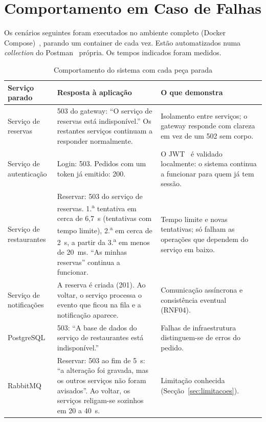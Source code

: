 \section{Comportamento em Caso de Falhas}

Os cenários seguintes foram executados no ambiente completo (Docker Compose)~\cite{compose}, parando um
container de cada vez. Estão automatizados numa \textit{collection} do Postman~\cite{postman} própria. Os tempos indicados foram medidos.

\begin{table}[H]
\centering
\small
\begin{tabularx}{\textwidth}{lXX}
\toprule
\textbf{Serviço parado} & \textbf{Resposta à aplicação} & \textbf{O que demonstra} \\
\midrule
Serviço de reservas &
503 do gateway: ``O serviço de reservas está indisponível.'' Os restantes serviços continuam
a responder normalmente. &
Isolamento entre serviços; o gateway responde com clareza em vez de um 502 sem corpo. \\
\midrule
Serviço de autenticação &
Login: 503. Pedidos com um token já emitido: 200. &
O JWT~\cite{rfc7519} é validado localmente: o sistema continua a funcionar para quem já tem sessão. \\
\midrule
Serviço de restaurantes &
Reservar: 503 do serviço de reservas. 1.\textsuperscript{a} tentativa em cerca de 6,7~s
(tentativas com tempo limite), 2.\textsuperscript{a} em cerca de 2~s, a partir da
3.\textsuperscript{a} em menos de 20~ms. ``As minhas reservas'' continua a
funcionar. &
Tempo limite e novas tentativas; só falham as operações que dependem do serviço em
baixo. \\
\midrule
Serviço de notificações &
A reserva é criada (201). Ao voltar, o serviço processa o evento que ficou na fila e a
notificação aparece. &
Comunicação assíncrona e consistência eventual (RNF04). \\
\midrule
PostgreSQL &
503: ``A base de dados do serviço de restaurantes está indisponível.'' &
Falhas de infraestrutura distinguem-se de erros do pedido. \\
\midrule
RabbitMQ &
Reservar: 503 ao fim de 5~s: ``a alteração foi gravada, mas os outros serviços não foram
avisados''. Ao voltar, os serviços religam-se sozinhos em 20 a 40~s. &
Limitação conhecida (Secção~\ref{sec:limitacoes}). \\
\bottomrule
\end{tabularx}
\caption{Comportamento do sistema com cada peça parada}
\label{tab:falhas}
\end{table}

